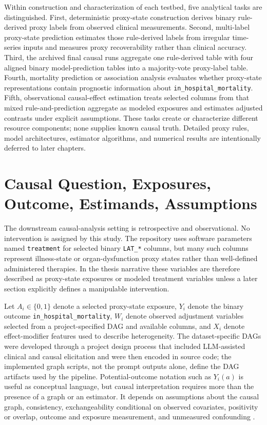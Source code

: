 Within construction and characterization of each testbed, five analytical tasks are distinguished.  First, deterministic proxy-state construction derives binary rule-derived proxy labels from observed clinical measurements.  Second, multi-label proxy-state prediction estimates those rule-derived labels from irregular time-series inputs and measures proxy recoverability rather than clinical accuracy.  Third, the archived final causal runs aggregate one rule-derived table with four aligned binary model-prediction tables into a majority-vote proxy-label table.  Fourth, mortality prediction or association analysis evaluates whether proxy-state representations contain prognostic information about \texttt{in\_hospital\_mortality}.  Fifth, observational causal-effect estimation treats selected columns from that mixed rule-and-prediction aggregate as modeled exposures and estimates adjusted contrasts under explicit assumptions.  These tasks create or characterize different resource components; none supplies known causal truth.  Detailed proxy rules, model architectures, estimator algorithms, and numerical results are intentionally deferred to later chapters.

\section{Causal Question, Exposures, Outcome, Estimands, Assumptions}
\label{sec:problem-definition-study-design:causal-question-exposures-outcome-estimands-assumptions}

The downstream causal-analysis setting is retrospective and observational.  No intervention is assigned by this study.  The repository uses software parameters named \texttt{treatment} for selected binary \texttt{LAT\_*} columns, but many such columns represent illness-state or organ-dysfunction proxy states rather than well-defined administered therapies.  In the thesis narrative these variables are therefore described as proxy-state exposures or modeled treatment variables unless a later section explicitly defines a manipulable intervention.

Let \(A_i\in\{0,1\}\) denote a selected proxy-state exposure, \(Y_i\) denote the binary outcome \texttt{in\_hospital\_mortality}, \(W_i\) denote observed adjustment variables selected from a project-specified DAG and available columns, and \(X_i\) denote effect-modifier features used to describe heterogeneity.  The dataset-specific DAGs were developed through a project design process that included LLM-assisted clinical and causal elicitation and were then encoded in source code; the implemented graph scripts, not the prompt outputs alone, define the DAG artifacts used by the pipeline.  Potential-outcome notation such as \(Y_i(a)\) is useful as conceptual language, but causal interpretation requires more than the presence of a graph or an estimator.  It depends on assumptions about the causal graph, consistency, exchangeability conditional on observed covariates, positivity or overlap, outcome and exposure measurement, and unmeasured confounding \cite{pearl_1995_causal_diagrams,hernan_robins_2016_target_trial,hernan_taubman_2008_well_defined_interventions}.

